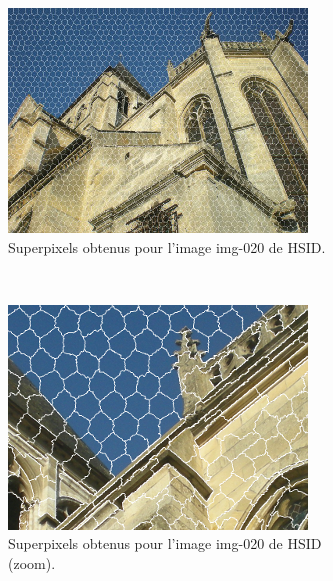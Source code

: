 \begin{figure}[b]
	\centering
	 \begin{subfigure}[t]{0.45\textwidth}	
			\includegraphics[width=\textwidth]{images/sur-segmentation/WP/EX1-img-020}
		 	\caption{Superpixels obtenus pour l'image img-020 de HSID.}
	\end{subfigure}
	~
	 \begin{subfigure}[t]{0.45\textwidth}	
			\includegraphics[width=\textwidth]{images/sur-segmentation/WP/EX1-img-020-Zoom}
		 	\caption{Superpixels obtenus pour l'image img-020 de HSID (zoom).}
	\end{subfigure}
	\\
	 \begin{subfigure}[t]{0.45\textwidth}	

\end{subfigure}
\end{figure}
